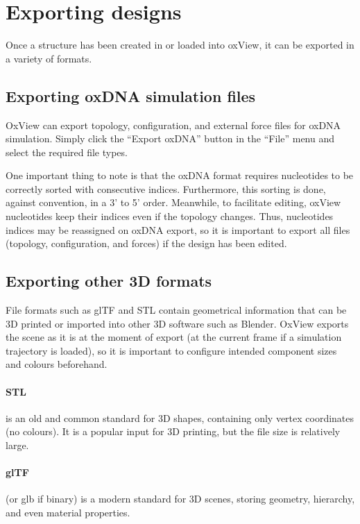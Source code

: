 \section{Exporting designs}
\label{sec:oxdna_export}
Once a structure has been created in or loaded into oxView, it can be exported in a variety of formats.

\subsection{Exporting oxDNA simulation files}
OxView can export topology, configuration, and external force files for oxDNA simulation. Simply click the ``Export oxDNA'' button in the ``File'' menu and select the required file types.

One important thing to note is that the oxDNA format requires nucleotides to be correctly sorted with consecutive indices. Furthermore, this sorting is done, against convention, in a 3' to 5' order. Meanwhile, to facilitate editing, oxView nucleotides keep their indices even if the topology changes. Thus, nucleotides indices may be reassigned on oxDNA export, so it is important to export all files (topology, configuration, and forces) if the design has been edited.

\subsection{Exporting other 3D formats}
File formats such as glTF and STL contain geometrical information that can be 3D printed or imported into other 3D software such as Blender. OxView exports the scene as it is at the moment of export (at the current frame if a simulation trajectory is loaded), so it is important to configure intended component sizes and colours beforehand.

\paragraph{STL} is an old and common standard for 3D shapes, containing only vertex coordinates (no colours). It is a popular input for 3D printing, but the file size is relatively large.

\paragraph{glTF} (or glb if binary) is a modern standard for 3D scenes, storing geometry, hierarchy, and even material properties.

